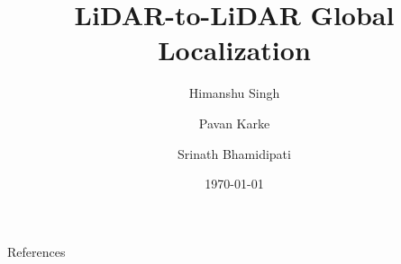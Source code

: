 \documentclass[9pt]{beamer}
\title{LiDAR-to-LiDAR Global Localization}
\author{Himanshu Singh \and Pavan Karke \and Srinath Bhamidipati}
\date{\today}
\begin{document}
\begin{frame}
    \titlepage
\end{frame}

\begin{frame}
    \tableofcontents
\end{frame}








\begin{frame}{References}
   \printbibliography[heading=none]
\end{frame}
\end{document}

